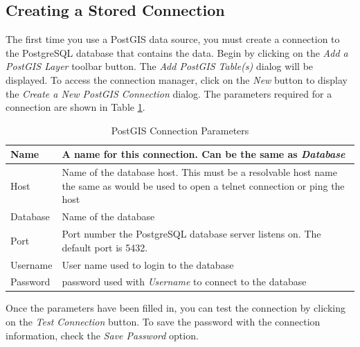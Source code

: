 \subsection{Creating a Stored Connection}
The first time
you use a PostGIS data source, you must create a connection to the PostgreSQL
database that contains the data. Begin by clicking on the \textit{Add a PostGIS
Layer} toolbar button. The \textsl{Add PostGIS Table(s)} dialog will be
displayed. To access the connection manager, click on the \textsl{New} button to
display the \textsl{Create a New PostGIS Connection} dialog. The parameters
required for a connection are shown in Table \ref{tab:postgis_connection_parms}.
\begin{table}[h]
\centering
\caption{PostGIS Connection Parameters}\label{tab:postgis_connection_parms}\medskip
 \begin{tabular}{|l|p{5in}|}
\hline Name & A name for this connection. Can be the same as \textsl{Database}
\\
\hline Host \index{PostgreSQL!host}
& Name of the database host. This must be a resolvable host name the same as would be used to open a telnet connection or ping the host \\
\hline Database \index{PostgreSQL!database} & Name of the database  \\
\hline Port \index{PostgreSQL!port}& Port number the PostgreSQL database server listens on. The default port is 5432.\\
\hline Username \index{PostgreSQL!username}& User name used to login to the database \\
\hline Password \index{PostgreSQL!password}& password used with \textsl{Username} to connect to the database\\
\hline
\end{tabular}
\end{table}
Once the parameters have been filled in, you can test the connection by clicking
on the \textsl{Test Connection} button. To save the password with the connection information, check the \textsl{Save Password} option.
\begin{Tip}\caption{\textsc{QGIS User Settings and
Security}}
\end{Tip}
